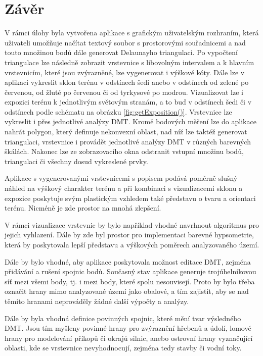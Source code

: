 \documentclass[11pt]{article}
\begin{document}

\section{Závěr}
V rámci úlohy byla vytvořena aplikace s grafickým uživatelským rozhraním, která uživateli umožňuje načítat textový soubor s prostorovými souřadnicemi a nad touto množinou bodů dále generovat Delaunayho triangulaci. Po vypočtení triangulace lze následně zobrazit vrstevnice s libovolným intervalem a k hlavním vrstevnicím, které jsou zvýrazněné, lze vygenerovat i výškové kóty. Dále lze v aplikaci vykreslit sklon terénu v odstínech šedi anebo v odstínech od zelené po červenou, od žluté po červenou či od tyrkysové po modrou. Vizualizovat lze i expozici terénu k jednotlivým světovým stranám, a to buď v odstínech šedi či v odstínech podle schématu na obrázku \ref{fig:getExposition()}.  Vrstevnice lze vykreslit i přes jednotlivé analýzy DMT. Kromě bodových měření lze do aplikace nahrát polygon, který definuje nekonvexní oblast, nad níž lze taktéž generovat triangulaci, vrstevnice i provádět jednotlivé analýzy DMT v různých barevných škálách. Nakonec lze ze zobrazovacího okna odstranit vstupní množinu bodů, triangulaci či všechny dosud vykreslené prvky.

Aplikace s vygenerovanými vrstevnicemi s popisem podává poměrně slušný náhled na výškový charakter terénu a při kombinaci s vizualizacemi sklonu a expozice poskytuje svým plastickým vzhledem také představu o tvaru a orientaci terénu. Nicméně je zde prostor na mnohá zlepšení. 

V rámci vizualizace vrstevnic by bylo například vhodné navrhnout algoritmus pro jejich vyhlazení. Dále by zde byl prostor pro implementaci barevné hypsometrie, která by poskytovala lepší představu a výškových poměrech analyzovaného území.

Dále by bylo vhodné, aby aplikace poskytovala možnost editace DMT, zejména přidávání a rušení spojnic bodů. Současný stav aplikace generuje trojúhelníkovou síť mezi všemi body, tj. i mezi body, které spolu nesouvisejí. Proto by bylo třeba označit hrany mimo analyzované území jako obalové, a tím zajistit, aby se nad těmito hranami neprováděly žádné další výpočty a analýzy. 

Dále by byla vhodná definice povinných spojnic, které mění tvar výsledného DMT. Jsou tím myšleny povinné hrany pro zvýraznění hřebenů a údolí, lomové hrany pro modelování příkopů či okrajů silnic, anebo ostrovní hrany vyznačující oblasti, kde se vrstevnice nevyhodnocují, zejména tedy stavby či vodní toky. 
\end{document}
